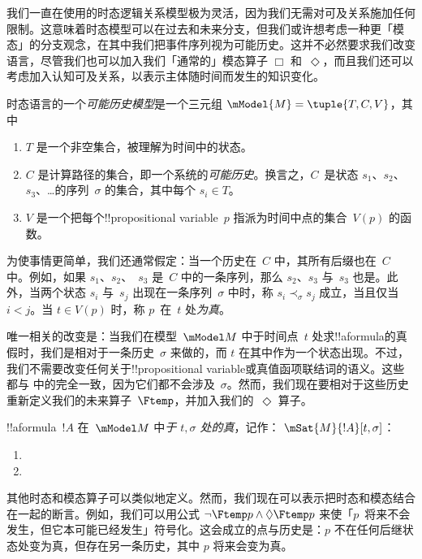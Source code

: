 \documentclass[../../../include/open-logic-section]{subfiles}
\begin{document}


我们一直在使用的时态逻辑关系模型极为灵活，因为我们无需对可及关系施加任何限制。这意味着时态模型可以在过去和未来分支，但我们或许想考虑一种更「模态」的分支观念，在其中我们把事件序列视为可能历史。这并不必然要求我们改变语言，尽管我们也可以加入我们「通常的」模态算子 $\Box$ 和~$\Diamond$，而且我们还可以考虑加入认知可及关系，以表示主体随时间而发生的知识变化。

\begin{defn}
  时态语言的一个\emph{可能历史模型}是一个三元组
  $\mModel{M} = \tuple{T, C, V}$，其中
  \begin{enumerate}
    \item $T$ 是一个非空集合，被理解为时间中的状态。
    \item $C$ 是计算路径的集合，即一个系统的\emph{可能历史}。换言之，$C$~是状态 $s_1$、$s_2$、~$s_3$、\dots 的序列~$\sigma$ 的集合，其中每个 $s_i \in T$。
    \item $V$ 是一个把每个!!{propositional variable}~$p$ 指派为时间中点的集合~$V(p)$ 的函数。
  \end{enumerate}
  为使事情更简单，我们还通常假定：当一个历史在~$C$ 中，其所有后缀也在~$C$ 中。例如，如果 $s_1$、$s_2$、~$s_3$ 是~$C$ 中的一条序列，那么 $s_2$、$s_3$ 与~$s_3$ 也是。此外，当两个状态 $s_i$ 与~$s_j$ 出现在一条序列~$\sigma$ 中时，称 $s_i \prec_\sigma s_j$ 成立，当且仅当 $i < j$。当 $t \in V(p)$ 时，称 $p$~在~$t$ 处\emph{为真}。
\end{defn}

唯一相关的改变是：当我们在模型~$\mModel M$ 中于时间点~$t$ 处求!!a{formula}的真假时，我们是相对于一条历史~$\sigma$ 来做的，而 $t$ 在其中作为一个状态出现。不过，我们不需要改变任何关于!!{propositional variable}或真值函项联结词的语义。这些都与  中的完全一致，因为它们都不会涉及~$\sigma$。然而，我们现在要相对于这些历史重新定义我们的未来算子~$\Ftemp$，并加入我们的~$\Diamond$ 算子。

\begin{defn}
  !!a{formula}~$!A$ 在~$\mModel M$ 中\emph{于 $t, \sigma$ 处的真}，记作：
  $\mSat{M}{!A}[t, \sigma]$：
  \begin{enumerate}
  \item{} 
  \item{} 
  \end{enumerate}
\end{defn}

其他时态和模态算子可以类似地定义。然而，我们现在可以表示把时态和模态结合在一起的断言。例如，我们可以用公式 $\lnot \Ftemp p \land \Diamond \Ftemp p$ 来使「$p$~将来不会发生，但它本可能已经发生」符号化。这会成立的点与历史是：$p$ 不在任何后继状态处变为真，但存在另一条历史，其中 $p$ 将来会变为真。
\end{document}

